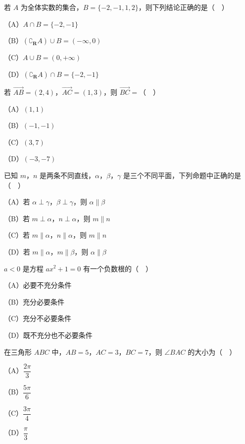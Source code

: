 


\begin{question}
若 $A$ 为全体实数的集合，$B=\{-2,-1,1,2\}$，则下列结论正确的是（　）

（A）$A\cap B=\{-2,-1\}$

（B）$(\complement_{\mathbf R}A)\cup B=(-\infty,0)$

（C）$A\cup B=(0,+\infty)$

（D）$(\complement_{\mathbf R}A)\cap B=\{-2,-1\}$

\end{question}
\begin{question}
若 $\overrightarrow{AB}=(2,4)$，$\overrightarrow{AC}=(1,3)$，则 $\overrightarrow{BC}=$（　）

（A）$(1,1)$

（B）$(-1,-1)$

（C）$(3,7)$

（D）$(-3,-7)$

\end{question}
\begin{question}
已知 $m$，$n$ 是两条不同直线，$\alpha$，$\beta$，$\gamma$ 是三个不同平面，下列命题中正确的是（　）

（A）若 $\alpha\perp\gamma$，$\beta\perp\gamma$，则 $\alpha\parallel\beta$

（B）若 $m\perp\alpha$，$n\perp\alpha$，则 $m\parallel n$

（C）若 $m\parallel\alpha$，$n\parallel\alpha$，则 $m\parallel n$

（D）若 $m\parallel\alpha$，$m\parallel\beta$，则 $\alpha\parallel\beta$

\end{question}
\begin{question}
$a<0$ 是方程 $ax^2+1=0$ 有一个负数根的（　）

（A）必要不充分条件

（B）充分必要条件

（C）充分不必要条件

（D）既不充分也不必要条件

\end{question}
\begin{question}
在三角形 $ABC$ 中，$AB=5$，$AC=3$，$BC=7$，则 $\angle BAC$ 的大小为（　）

（A）$\dfrac{2\pi}{3}$

（B）$\dfrac{5\pi}{6}$

（C）$\dfrac{3\pi}{4}$

（D）$\dfrac{\pi}{3}$

\end{question}
